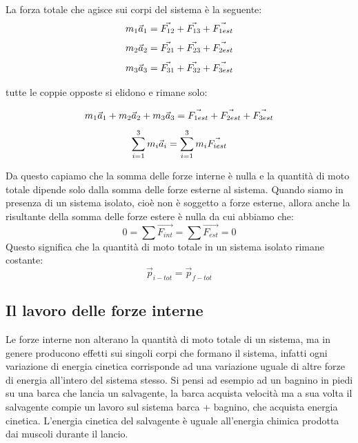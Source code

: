 La forza totale che agisce sui corpi del sistema è la seguente:
\begin{equation*}
    m_1\vec{a}_1 = \vec{F_{12}} + \vec{F_{13}} + \vec{F_{1est}}
\end{equation*}
\begin{equation*}
    m_2\vec{a}_2 = \vec{F_{21}} + \vec{F_{23}} + \vec{F_{2est}}
\end{equation*}
\begin{equation*}
    m_3\vec{a}_3 = \vec{F_{31}} + \vec{F_{32}} + \vec{F_{3est}}
\end{equation*}

tutte le coppie opposte si elidono e rimane solo:

\begin{equation*}
     m_1\vec{a}_1 + m_2\vec{a}_2+  m_3\vec{a}_3 = \vec{F_{1est}} +\vec{F_{2est}} + \vec{F_{3est}}
\end{equation*}
\begin{equation}
    \sum_{i = 1} ^ 3 m_i\vec{a}_i = \sum_{i = 1} ^ 3 m_i\vec{F_{iest}}
\end{equation}

Da questo capiamo che la somma delle forze interne è nulla e la quantità di moto totale dipende solo dalla somma delle forze esterne al sistema.
Quando siamo in presenza di un sistema isolato, cioè non è soggetto a forze esterne, allora anche la risultante della somma delle forze estere è nulla da cui abbiamo che:
\begin{equation}
    0 = \sum \vec{F_{int}} = \sum \vec{F_{est}} = 0
\end{equation}
Questo significa che la quantità di moto totale in un sistema isolato rimane costante:
\begin{equation}
    \vec{p}_{i-tot} = \vec{p}_{f-tot}
\end{equation}

\subsection{Il lavoro delle forze interne}
Le forze interne non alterano la quantità di moto totale di un sistema, ma in genere producono effetti sui singoli corpi che formano il sistema, infatti ogni variazione di energia cinetica corrisponde ad una variazione uguale di altre forze di energia all'intero del sistema stesso.
 Si pensi ad esempio ad un bagnino in piedi su una barca che lancia un salvagente, la barca acquista velocità ma a sua volta il salvagente compie un lavoro sul sistema barca + bagnino, che acquista energia cinetica. L’energia cinetica del salvagente è uguale all'energia chimica prodotta dai muscoli durante il lancio.
 
